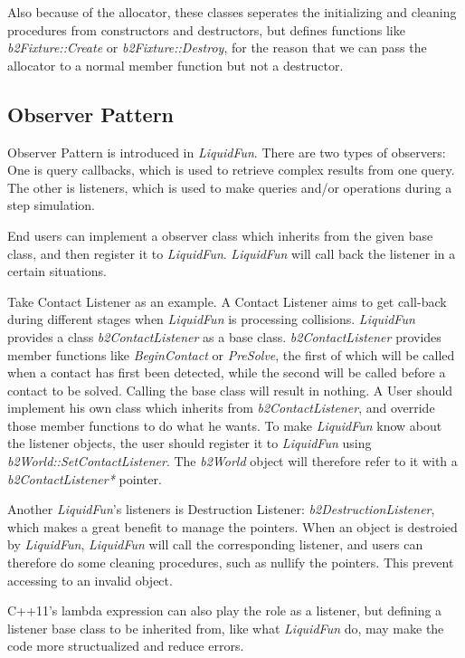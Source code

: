 \documentclass[UTF8]{ctexart}
\begin{document}
            Also because of the allocator, these classes seperates the initializing and cleaning procedures from constructors and destructors, but defines functions like \textit{b2Fixture::Create} or \textit{b2Fixture::Destroy}, for the reason that we can pass the allocator to a normal member function but not a destructor.

        \subsection{Observer Pattern}

            Observer Pattern is introduced in \textit{LiquidFun}. There are two types of observers: One is query callbacks, which is used to retrieve complex results from one query. The other is listeners, which is used to make queries and/or operations during a step simulation.

            End users can implement a observer class which inherits from the given base class, and then register it to \textit{LiquidFun}. \textit{LiquidFun} will call back the listener in a certain situations.

            Take Contact Listener as an example. A Contact Listener aims to get call-back during different stages when \textit{LiquidFun} is processing collisions. \textit{LiquidFun} provides a class \textit{b2ContactListener} as a base class. \textit{b2ContactListener} provides member functions like \textit{BeginContact} or \textit{PreSolve}, the first of which will be called when a contact has first been detected, while the second will be called before a contact to be solved. Calling the base class will result in nothing. A User should implement his own class which inherits from \textit{b2ContactListener}, and override those member functions to do what he wants. To make \textit{LiquidFun} know about the listener objects, the user should register it to \textit{LiquidFun} using \textit{b2World::SetContactListener}. The \textit{b2World} object will therefore refer to it with a \textit{b2ContactListener*} pointer.

            Another \textit{LiquidFun}'s listeners is Destruction Listener: \textit{b2DestructionListener}, which makes a great benefit to manage the pointers. When an object is destroied by \textit{LiquidFun}, \textit{LiquidFun} will call the corresponding listener, and users can therefore do some cleaning procedures, such as nullify the pointers. This prevent accessing to an invalid object.

            C++11's lambda expression can also play the role as a listener, but defining a listener base class to be inherited from, like what \textit{LiquidFun} do, may make the code more structualized and reduce errors.
\end{document}
